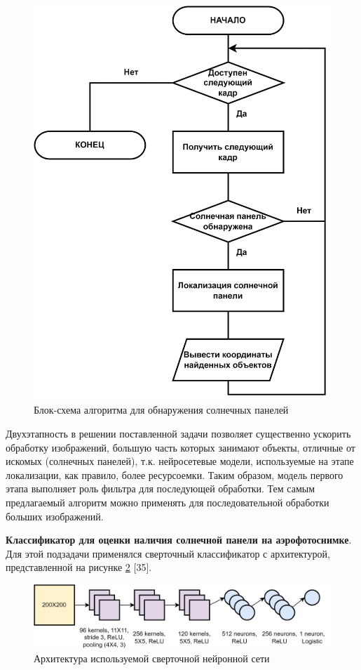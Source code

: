 \begin{figure}[ht]
	\centering
	\includegraphics[width=12cm]{man-source/images/ch4/pic4-16a.png}
	\caption{Блок-схема алгоритма для обнаружения солнечных панелей}
	\label{fig:solar_system_arch}
\end{figure}

Двухэтапность в решении поставленной задачи позволяет существенно ускорить обработку изображений, большую часть которых занимают объекты, отличные от искомых (солнечных панелей), т.к. нейросетевые модели, используемые на этапе локализации, как правило, более ресурсоемки. Таким образом, модель первого этапа выполняет роль фильтра для последующей обработки. Тем самым предлагаемый алгоритм можно применять для последовательной обработки больших изображений.

\textbf{Классификатор для оценки наличия солнечной панели на аэрофотоснимке}. Для этой подзадачи применялся сверточный классификатор с архитектурой, представленной на рисунке \ref{fig:used_cnn} [35]. 

\begin{figure}[ht]
	\centering
	\includegraphics[width=17cm]{man-source/images/ch4/pic4-19.png}
	\caption{Архитектура используемой сверточной нейронной сети}
	\label{fig:used_cnn}
\end{figure}

